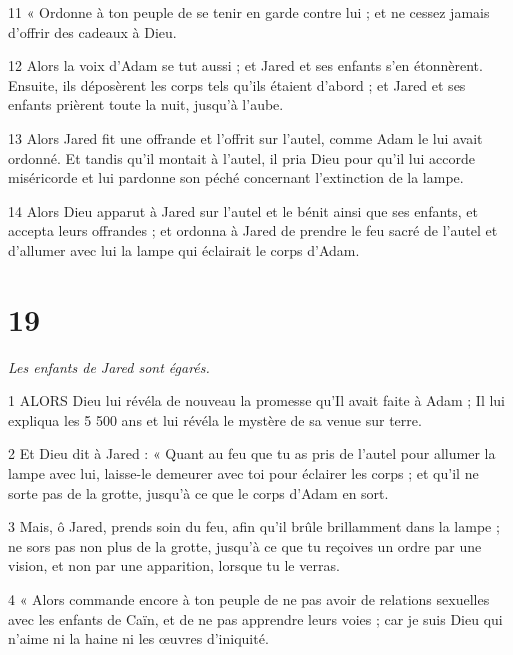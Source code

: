 \par 11 « Ordonne à ton peuple de se tenir en garde contre lui ; et ne cessez jamais d’offrir des cadeaux à Dieu.

\par 12 Alors la voix d'Adam se tut aussi ; et Jared et ses enfants s'en étonnèrent. Ensuite, ils déposèrent les corps tels qu'ils étaient d'abord ; et Jared et ses enfants prièrent toute la nuit, jusqu'à l'aube.

\par 13 Alors Jared fit une offrande et l'offrit sur l'autel, comme Adam le lui avait ordonné. Et tandis qu'il montait à l'autel, il pria Dieu pour qu'il lui accorde miséricorde et lui pardonne son péché concernant l'extinction de la lampe.

\par 14 Alors Dieu apparut à Jared sur l'autel et le bénit ainsi que ses enfants, et accepta leurs offrandes ; et ordonna à Jared de prendre le feu sacré de l'autel et d'allumer avec lui la lampe qui éclairait le corps d'Adam.

\chapter{19}

\par \textit{Les enfants de Jared sont égarés.}

\par 1 ALORS Dieu lui révéla de nouveau la promesse qu'Il avait faite à Adam ; Il lui expliqua les 5 500 ans et lui révéla le mystère de sa venue sur terre.

\par 2 Et Dieu dit à Jared : « Quant au feu que tu as pris de l'autel pour allumer la lampe avec lui, laisse-le demeurer avec toi pour éclairer les corps ; et qu'il ne sorte pas de la grotte, jusqu'à ce que le corps d'Adam en sort.

\par 3 Mais, ô Jared, prends soin du feu, afin qu'il brûle brillamment dans la lampe ; ne sors pas non plus de la grotte, jusqu'à ce que tu reçoives un ordre par une vision, et non par une apparition, lorsque tu le verras.

\par 4 « Alors commande encore à ton peuple de ne pas avoir de relations sexuelles avec les enfants de Caïn, et de ne pas apprendre leurs voies ; car je suis Dieu qui n’aime ni la haine ni les œuvres d’iniquité.

